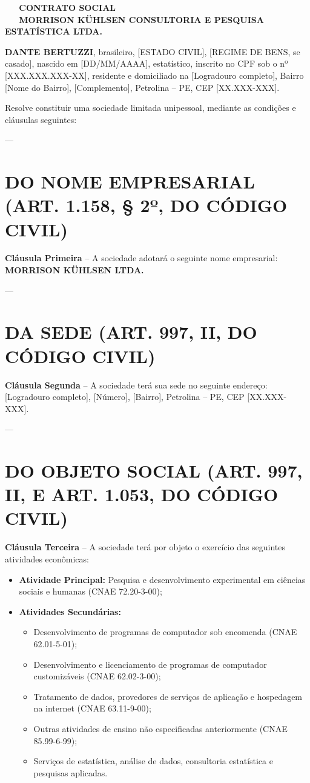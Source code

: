 \documentclass[12pt,a4paper]{article}
\newcommand{\secao}[1]{\section*{{\large\textbf{#1}}}}
\begin{document}
\begin{center}
    \textbf{\Large CONTRATO SOCIAL}\\[0.5cm]
    \textbf{\large MORRISON KÜHLSEN CONSULTORIA E PESQUISA ESTATÍSTICA LTDA.}
\end{center}

\vspace{1cm}

\noindent\textbf{DANTE BERTUZZI}, brasileiro, [ESTADO CIVIL], [REGIME DE BENS, se casado], nascido em [DD/MM/AAAA], estatístico, inscrito no CPF sob o nº [XXX.XXX.XXX-XX], residente e domiciliado na [Logradouro completo], Bairro [Nome do Bairro], [Complemento], Petrolina -- PE, CEP [XX.XXX-XXX].

\vspace{0.5cm}

\noindent Resolve constituir uma sociedade limitada unipessoal, mediante as condições e cláusulas seguintes:

\vspace{0.5cm}

---
\secao{DO NOME EMPRESARIAL (ART. 1.158, § 2º, DO CÓDIGO CIVIL)}

\noindent\textbf{Cláusula Primeira} -- A sociedade adotará o seguinte nome empresarial: \textbf{MORRISON KÜHLSEN LTDA.}

---
\secao{DA SEDE (ART. 997, II, DO CÓDIGO CIVIL)}

\noindent\textbf{Cláusula Segunda} -- A sociedade terá sua sede no seguinte endereço: [Logradouro completo], [Número], [Bairro], Petrolina -- PE, CEP [XX.XXX-XXX].

---
\secao{DO OBJETO SOCIAL (ART. 997, II, E ART. 1.053, DO CÓDIGO CIVIL)}

\noindent\textbf{Cláusula Terceira} -- A sociedade terá por objeto o exercício das seguintes atividades econômicas:

\begin{itemize}
    \item \textbf{Atividade Principal:} Pesquisa e desenvolvimento experimental em ciências sociais e humanas (CNAE 72.20-3-00);
    
    \item \textbf{Atividades Secundárias:}
    \begin{itemize}
        \item Desenvolvimento de programas de computador sob encomenda (CNAE 62.01-5-01);
        \item Desenvolvimento e licenciamento de programas de computador customizáveis (CNAE 62.02-3-00);
        \item Tratamento de dados, provedores de serviços de aplicação e hospedagem na internet (CNAE 63.11-9-00);
        \item Outras atividades de ensino não especificadas anteriormente (CNAE 85.99-6-99);
        \item Serviços de estatística, análise de dados, consultoria estatística e pesquisas aplicadas.
    \end{itemize}
\end{itemize}
\end{document}
